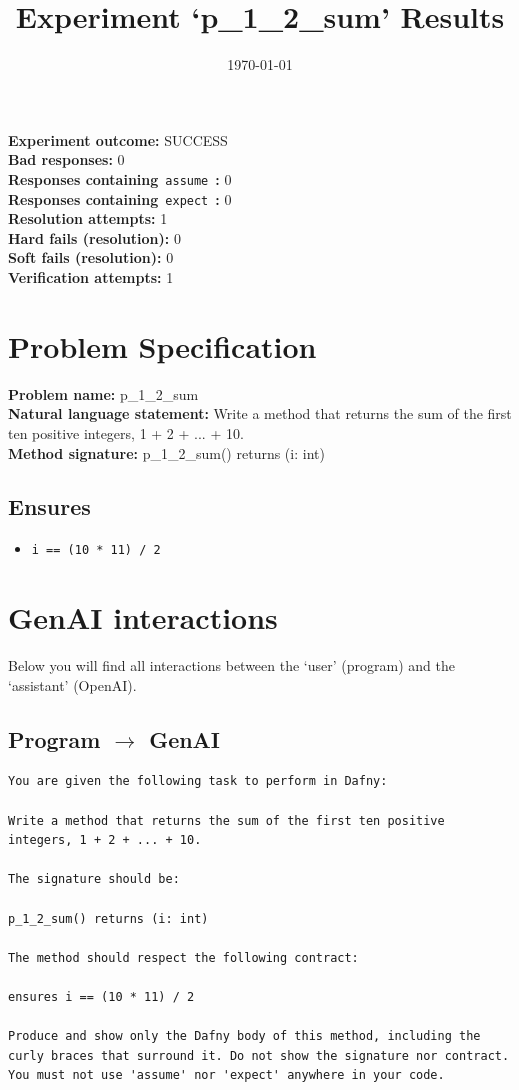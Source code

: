 \documentclass{article}
\begin{document}
\title{Experiment `p\_1\_2\_sum' Results}
\author{\today}
\date{}
\maketitle
\textbf{Experiment outcome: }SUCCESS
\\\textbf{Bad responses: }0
\\\textbf{Responses containing}~\texttt{assume}~\textbf{: }0
\\\textbf{Responses containing}~\texttt{expect}~\textbf{: }0
\\\textbf{Resolution attempts: }1
\\\textbf{Hard fails (resolution): }0
\\\textbf{Soft fails (resolution): }0
\\\textbf{Verification attempts: }1
\section*{Problem Specification}
\textbf{Problem name: }p\_1\_2\_sum
\\\textbf{Natural language statement: }Write a method that returns the sum of the first ten positive integers, 1 + 2 + ... + 10.
\\\textbf{Method signature: }p\_1\_2\_sum() returns (i: int)
\subsection*{Ensures}
\begin{itemize}
\item \texttt{i == (10 * 11) / 2}
\end{itemize}
\clearpage
\section*{GenAI interactions}
Below you will find all interactions between the `user' (program) and the `assistant' (OpenAI).
\subsection*{Program $\rightarrow$ GenAI}
\begin{lstlisting}
You are given the following task to perform in Dafny:

Write a method that returns the sum of the first ten positive integers, 1 + 2 + ... + 10.

The signature should be:

p_1_2_sum() returns (i: int)

The method should respect the following contract:

ensures i == (10 * 11) / 2

Produce and show only the Dafny body of this method, including the curly braces that surround it. Do not show the signature nor contract. You must not use 'assume' nor 'expect' anywhere in your code.
\end{lstlisting}
\end{document}
